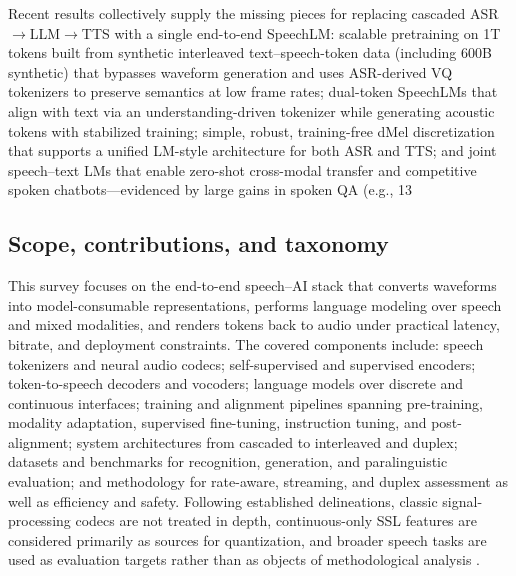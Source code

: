 \documentclass{article}
\begin{document}
Recent results collectively supply the missing pieces for replacing cascaded ASR$\rightarrow$LLM$\rightarrow$TTS with a single end-to-end SpeechLM: scalable pretraining on 1T tokens built from synthetic interleaved text--speech-token data (including 600B synthetic) that bypasses waveform generation and uses ASR-derived VQ tokenizers to preserve semantics at low frame rates; dual-token SpeechLMs that align with text via an understanding-driven tokenizer while generating acoustic tokens with stabilized training; simple, robust, training-free dMel discretization that supports a unified LM-style architecture for both ASR and TTS; and joint speech--text LMs that enable zero-shot cross-modal transfer and competitive spoken chatbots---evidenced by large gains in spoken QA (e.g., 13%



\subsection{Scope, contributions, and taxonomy} \label{subsec:scope,contributions,andtaxonomy}

This survey focuses on the end-to-end speech--AI stack that converts waveforms into model-consumable representations, performs language modeling over speech and mixed modalities, and renders tokens back to audio under practical latency, bitrate, and deployment constraints. The covered components include: speech tokenizers and neural audio codecs; self-supervised and supervised encoders; token-to-speech decoders and vocoders; language models over discrete and continuous interfaces; training and alignment pipelines spanning pre-training, modality adaptation, supervised fine-tuning, instruction tuning, and post-alignment; system architectures from cascaded to interleaved and duplex; datasets and benchmarks for recognition, generation, and paralinguistic evaluation; and methodology for rate-aware, streaming, and duplex assessment as well as efficiency and safety. Following established delineations, classic signal-processing codecs are not treated in depth, continuous-only SSL features are considered primarily as sources for quantization, and broader speech tasks are used as evaluation targets rather than as objects of methodological analysis \cite{guo2025recentadvancesdiscretespeechtokensreview}.
\end{document}
